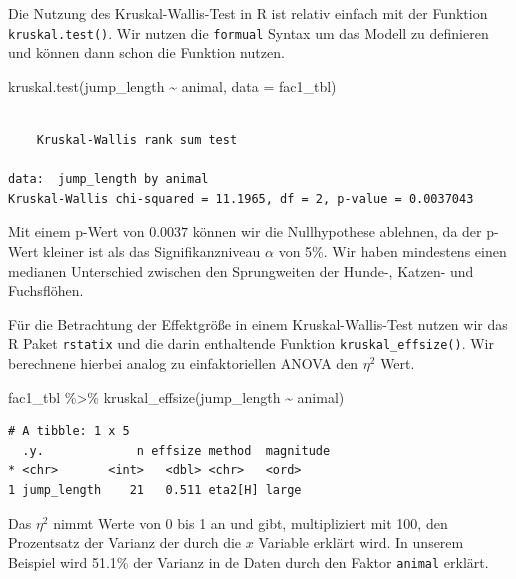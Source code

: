 \documentclass[
  letterpaper,
  DIV=11,
  oneside]{scrreport}
\newenvironment{Shaded}{\begin{snugshade}}{\end{snugshade}}
\newcommand{\AttributeTok}[1]{\textcolor[rgb]{0.40,0.45,0.13}{#1}}
\newcommand{\FunctionTok}[1]{\textcolor[rgb]{0.28,0.35,0.67}{#1}}
\newcommand{\NormalTok}[1]{\textcolor[rgb]{0.00,0.23,0.31}{#1}}
\newcommand{\SpecialCharTok}[1]{\textcolor[rgb]{0.37,0.37,0.37}{#1}}
\begin{document}
Die Nutzung des Kruskal-Wallis-Test in R ist relativ einfach mit der
Funktion \texttt{kruskal.test()}. Wir nutzen die \texttt{formual} Syntax
um das Modell zu definieren und können dann schon die Funktion nutzen.

\begin{Shaded}
\begin{Highlighting}[]
\FunctionTok{kruskal.test}\NormalTok{(jump\_length }\SpecialCharTok{\textasciitilde{}}\NormalTok{ animal, }\AttributeTok{data =}\NormalTok{ fac1\_tbl) }
\end{Highlighting}
\end{Shaded}

\begin{verbatim}

    Kruskal-Wallis rank sum test

data:  jump_length by animal
Kruskal-Wallis chi-squared = 11.1965, df = 2, p-value = 0.0037043
\end{verbatim}

Mit einem p-Wert von \(0.0037\) können wir die Nullhypothese ablehnen,
da der p-Wert kleiner ist als das Signifikanzniveau \(\alpha\) von 5\%.
Wir haben mindestens einen medianen Unterschied zwischen den
Sprungweiten der Hunde-, Katzen- und Fuchsflöhen.

Für die Betrachtung der Effektgröße in einem Kruskal-Wallis-Test nutzen
wir das R Paket \texttt{rstatix} und die darin enthaltende Funktion
\texttt{kruskal\_effsize()}. Wir berechnene hierbei analog zu
einfaktoriellen ANOVA den \(\eta^2\) Wert.

\begin{Shaded}
\begin{Highlighting}[]
\NormalTok{fac1\_tbl }\SpecialCharTok{\%\textgreater{}\%} \FunctionTok{kruskal\_effsize}\NormalTok{(jump\_length }\SpecialCharTok{\textasciitilde{}}\NormalTok{ animal)}
\end{Highlighting}
\end{Shaded}

\begin{verbatim}
# A tibble: 1 x 5
  .y.             n effsize method  magnitude
* <chr>       <int>   <dbl> <chr>   <ord>    
1 jump_length    21   0.511 eta2[H] large    
\end{verbatim}

Das \(\eta^2\) nimmt Werte von 0 bis 1 an und gibt, multipliziert mit
100, den Prozentsatz der Varianz der durch die \(x\) Variable erklärt
wird. In unserem Beispiel wird 51.1\% der Varianz in de Daten durch den
Faktor \texttt{animal} erklärt.
\end{document}
